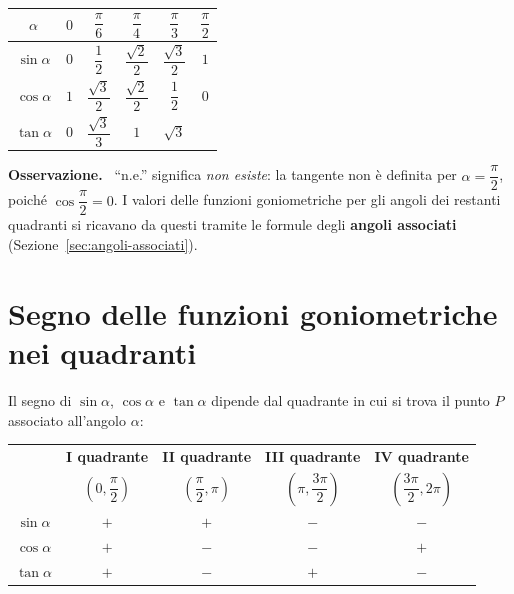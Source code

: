 \documentclass[11pt,a4paper]{article}
\newenvironment{osservazione}{%
  \par\vspace{4pt}\noindent
  \textbf{\color{orange!70!black}Osservazione.}\ 
}{%
  \par\vspace{4pt}
}
\begin{document}
\begin{center}
\renewcommand{\arraystretch}{2.0}
\begin{tabular}{|c|c|c|c|c|c|}
\hline
$\alpha$ & $0$ & $\dfrac{\pi}{6}$ & $\dfrac{\pi}{4}$ & $\dfrac{\pi}{3}$ & $\dfrac{\pi}{2}$ \\
\hline
$\sin\alpha$ & $0$ & $\dfrac{1}{2}$ & $\dfrac{\sqrt{2}}{2}$ & $\dfrac{\sqrt{3}}{2}$ & $1$ \\
\hline
$\cos\alpha$ & $1$ & $\dfrac{\sqrt{3}}{2}$ & $\dfrac{\sqrt{2}}{2}$ & $\dfrac{1}{2}$ & $0$ \\
\hline
$\tan\alpha$ & $0$ & $\dfrac{\sqrt{3}}{3}$ & $1$ & $\sqrt{3}$ & \text{n.e.} \\
\hline
\end{tabular}
\end{center}

\begin{osservazione}
``n.e.'' significa \emph{non esiste}: la tangente non \`e definita per $\alpha=\dfrac{\pi}{2}$, poich\'e $\cos\dfrac{\pi}{2}=0$. I valori delle funzioni goniometriche per gli angoli dei restanti quadranti si ricavano da questi tramite le formule degli \textbf{angoli associati} (Sezione~\ref{sec:angoli-associati}).
\end{osservazione}

\section{Segno delle funzioni goniometriche nei quadranti}
\label{sec:segno-quadranti}

Il segno di $\sin\alpha$, $\cos\alpha$ e $\tan\alpha$ dipende dal quadrante in cui si trova il punto $P$ associato all'angolo $\alpha$:

\begin{center}
\renewcommand{\arraystretch}{1.6}
\begin{tabular}{|c|c|c|c|c|}
\hline
 & \textbf{I quadrante} & \textbf{II quadrante} & \textbf{III quadrante} & \textbf{IV quadrante} \\
 & $\left(0,\dfrac{\pi}{2}\right)$ & $\left(\dfrac{\pi}{2},\pi\right)$ & $\left(\pi,\dfrac{3\pi}{2}\right)$ & $\left(\dfrac{3\pi}{2},2\pi\right)$ \\
\hline
$\sin\alpha$ & $+$ & $+$ & $-$ & $-$ \\
\hline
$\cos\alpha$ & $+$ & $-$ & $-$ & $+$ \\
\hline
$\tan\alpha$ & $+$ & $-$ & $+$ & $-$ \\
\hline
\end{tabular}
\end{center}
\end{document}
